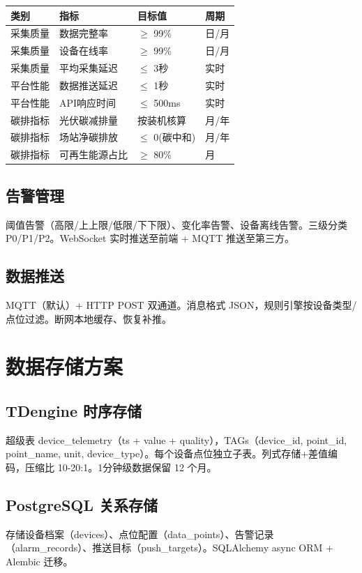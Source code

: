 \documentclass[12pt,a4paper]{ctexart}
\begin{document}
\begin{table}[H]\centering
\begin{tabular}{p{2cm}p{3.5cm}p{2.5cm}p{2cm}}
\toprule\textbf{类别} & \textbf{指标} & \textbf{目标值} & \textbf{周期} \\
\midrule
采集质量 & 数据完整率 & $\geq$ 99\% & 日/月 \\
采集质量 & 设备在线率 & $\geq$ 99\% & 日/月 \\
采集质量 & 平均采集延迟 & $\leq$ 3秒 & 实时 \\
平台性能 & 数据推送延迟 & $\leq$ 1秒 & 实时 \\
平台性能 & API响应时间 & $\leq$ 500ms & 实时 \\
碳排指标 & 光伏碳减排量 & 按装机核算 & 月/年 \\
碳排指标 & 场站净碳排放 & $\leq$ 0(碳中和) & 月/年 \\
碳排指标 & 可再生能源占比 & $\geq$ 80\% & 月 \\
\bottomrule
\end{tabular}
\end{table}

\subsection{告警管理}

阈值告警（高限/上上限/低限/下下限）、变化率告警、设备离线告警。三级分类 P0/P1/P2。WebSocket 实时推送至前端 + MQTT 推送至第三方。

\subsection{数据推送}

MQTT（默认）+ HTTP POST 双通道。消息格式 JSON，规则引擎按设备类型/点位过滤。断网本地缓存、恢复补推。

\section{数据存储方案}

\subsection{TDengine 时序存储}
超级表 device\_telemetry（ts + value + quality），TAGs（device\_id, point\_id, point\_name, unit, device\_type）。每个设备点位独立子表。列式存储+差值编码，压缩比 10-20:1。1分钟级数据保留 12 个月。

\subsection{PostgreSQL 关系存储}
存储设备档案（devices）、点位配置（data\_points）、告警记录（alarm\_records）、推送目标（push\_targets）。SQLAlchemy async ORM + Alembic 迁移。
\end{document}
